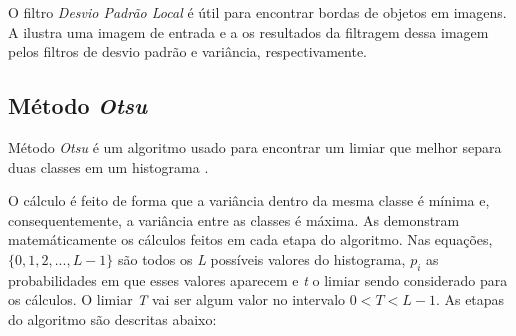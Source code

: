 \par O filtro \textit{Desvio Padrão Local} é útil para encontrar bordas de objetos em imagens. A  ilustra uma imagem de entrada e a  os resultados da filtragem dessa imagem pelos filtros de desvio padrão e variância, respectivamente.





\subsection{Método \textit{Otsu}}\label{sec:dom_esp:otsu}

\par Método \textit{Otsu} é um algoritmo usado para encontrar um limiar que melhor separa duas classes em um histograma \cite{otsumethod}.

\par O cálculo é feito de forma que a variância dentro da mesma classe é mínima e, consequentemente, a variância entre as classes é máxima. As  demonstram matemáticamente os cálculos feitos em cada etapa do algoritmo. Nas equações, $\{0, 1, 2, ..., L - 1\}$ são todos os \textit{L} possíveis valores do histograma, $p_{i}$ as probabilidades em que esses valores aparecem e \textit{t} o limiar sendo considerado para os cálculos. O limiar \textit{T} vai ser algum valor no intervalo $0 < T < L - 1$. As etapas do algoritmo são descritas abaixo:

